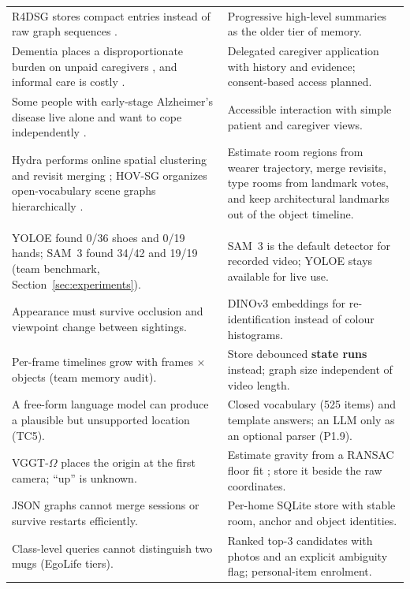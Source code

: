 \begin{ltab}
\begin{longtable}{@{}L{7.2cm}L{7.2cm}@{}}
R4DSG stores compact entries instead of raw graph sequences
\cite{r4dsg2026}. & Progressive high-level summaries as the older tier of
memory.\\
Dementia places a disproportionate burden on unpaid caregivers
\cite{kasper2015}, and informal care is costly \cite{arno1999,chari2015}. &
Delegated caregiver application with history and evidence; consent-based access planned.\\
Some people with early-stage Alzheimer's disease live alone and want to cope
independently \cite{harris2006}. & Accessible interaction with simple patient and caregiver views.\\
Hydra performs online spatial clustering and revisit merging \cite{hydra2022}; HOV-SG organizes open-vocabulary scene graphs hierarchically \cite{hovsg2024}. & Estimate room regions from wearer trajectory, merge revisits, type rooms from landmark votes, and keep architectural landmarks out of the object timeline.\\
\\
YOLOE found 0/36 shoes and 0/19 hands; SAM~3 \cite{sam3} found 34/42 and 19/19 (team benchmark, Section~\ref{sec:experiments}). & SAM~3 is the default detector for recorded video; YOLOE \cite{yoloe} stays available for live use.\\
Appearance must survive occlusion and viewpoint change between sightings. & DINOv3 \cite{dinov3} embeddings for re-identification instead of colour histograms.\\
Per-frame timelines grow with frames $\times$ objects (team memory audit). & Store debounced \textbf{state runs} instead; graph size independent of video length.\\
A free-form language model can produce a plausible but unsupported location (TC5). & Closed vocabulary (525 items) and template answers; an LLM only as an optional parser (P1.9).\\
VGGT-$\Omega$ places the origin at the first camera; ``up'' is unknown. & Estimate gravity from a RANSAC floor fit \cite{ransac1981}; store it beside the raw coordinates.\\
JSON graphs cannot merge sessions or survive restarts efficiently. & Per-home SQLite store with stable room, anchor and object identities.\\
Class-level queries cannot distinguish two mugs (EgoLife tiers). & Ranked top-3 candidates with photos and an explicit ambiguity flag; personal-item enrolment.\\
\end{longtable}
\end{ltab}


